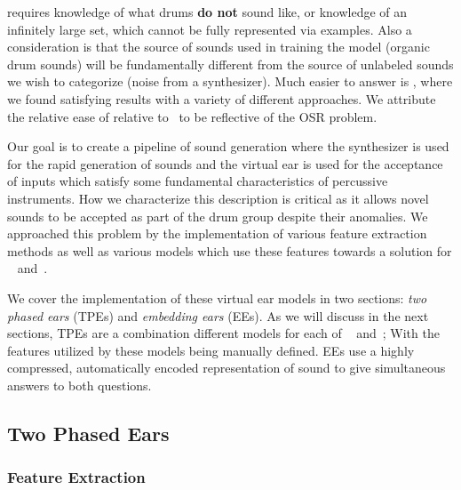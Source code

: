 \documentclass[\main/thesis.tex]{subfiles}
\begin{document}
 requires knowledge of what drums \textbf{do not} sound like, or knowledge of an infinitely large set, which cannot be fully represented via examples. Also a consideration is that the source of sounds used in training the model (organic drum sounds) will be fundamentally different from the source of unlabeled sounds we wish to categorize (noise from a synthesizer). Much easier to answer is , where we found satisfying results with a variety of different approaches. We attribute the relative ease of  relative to~ to be reflective of the OSR problem. 


Our goal is to create a pipeline of sound generation where the synthesizer is used for the rapid generation of sounds and the virtual ear is used for the acceptance of inputs which satisfy some fundamental characteristics of percussive instruments. How we characterize this description is critical as it allows novel sounds to be accepted as part of the drum group despite their anomalies. We approached this problem by the implementation of various feature extraction methods as well as various models which use these features towards a solution for ~ and~.


We cover the implementation of these virtual ear models in two sections: \emph{two phased ears} (TPEs) and \emph{embedding ears} (EEs). As we will discuss in the next sections, TPEs are a combination different models for each of ~ and~; With the features utilized by these models being manually defined. EEs use a highly compressed, automatically encoded representation of sound to give simultaneous answers to both questions.

\subsection{Two Phased Ears}
\label{sec:ear}
\subsubsection{Feature Extraction}
\end{document}
